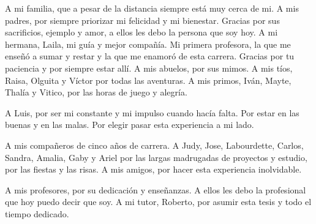 \begin{acknowledgements}
	A mi familia, que a pesar de la distancia siempre está muy cerca de mi. A mis padres, por siempre priorizar mi felicidad y mi bienestar. Gracias por sus sacrificios, ejemplo y amor, a ellos les debo la persona que soy hoy. A mi hermana, Laila, mi guía y mejor compañía. Mi primera profesora, la que me enseñó a sumar y restar y la que me enamoró de esta carrera. Gracias por tu paciencia y por siempre estar allí. A mis abuelos, por sus mimos. A mis tíos, Raisa, Olguita y Víctor por todas las aventuras. A mis primos, Iván, Mayte, Thalía y Vitico, por las horas de juego y alegría.
	
	A Luis, por ser mi constante y mi impulso cuando hacía falta. Por estar en las buenas y en las malas. Por elegir pasar esta experiencia a mi lado.
	
	A mis compañeros de cinco años de carrera. A Judy, Jose, Labourdette, Carlos, Sandra, Amalia, Gaby y Ariel por las largas madrugadas de proyectos y estudio, por las fiestas y las risas. A mis amigos, por hacer esta experiencia inolvidable.
	
	A mis profesores, por su dedicación y enseñanzas. A ellos les debo la profesional que hoy puedo decir que soy. A mi tutor, Roberto, por asumir esta tesis y todo el tiempo dedicado.
\end{acknowledgements}